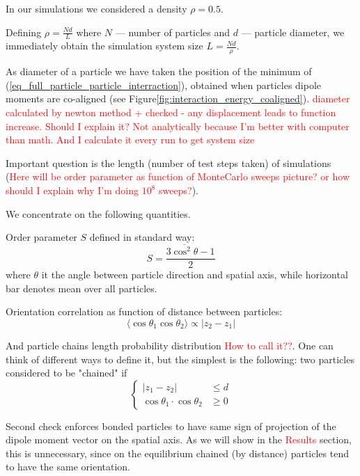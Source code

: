 \documentclass[12pt,a4paper]{article}
\begin{document}
In our simulations we considered a density $\rho = 0.5$.  

Defining $\rho = \frac{N d}{L}$ where $N$ --- number of particles and $d$ --- particle diameter, we immediately obtain the simulation system size $L = \frac{Nd}{\rho}$.

As diameter of a particle we have taken the position of the minimum of (\ref{eq_full_particle_particle_interraction}), obtained when particles dipole moments are co-aligned (see Figure\ref{fig:interaction_energy_coaligned}). \textcolor{red}{diameter calculated by newton method + checked - any displacement leads to function increase. Should I explain it? Not analytically because I'm better with computer than math. And I calculate it every run to get system size}

Important question is the length (number of test steps taken) of simulations (\textcolor{red}{Here will be order parameter as function of MonteCarlo sweeps picture? or how should I explain why I'm doing $10^8$ sweeps?}).

We concentrate on the following quantities.

Order parameter $S$ defined in standard way:
\begin{equation}
S = \frac{3 \overline{\cos^2 \theta} - 1}{2}
\end{equation}
where $\theta$ it the angle between particle direction and spatial axis, while horizontal bar denotes mean over all particles.

Orientation correlation as function of distance between particles:
\begin{equation}
\langle\cos \theta_1 \cos \theta_2\rangle \propto |z_2 - z_1|
\end{equation}

And particle chains length probability distribution \textcolor{red}{How to call it??}. One can think of different ways to define it, but the simplest is the following: two particles considered to be "chained" if 
\begin{equation}
\begin{cases}
	|z_1 - z_2| &\leq d\\
	\cos \theta_1 \cdot \cos \theta_2 &\geq 0
\end{cases}
\end{equation}

Second check enforces bonded particles to have same sign of projection of the dipole moment vector on the spatial axis. As we will show in the \textcolor{red}{Results} section, this is unnecessary, since on the equilibrium chained (by distance) particles tend to have the same orientation.

\cite{Camp2000}



\end{document}
